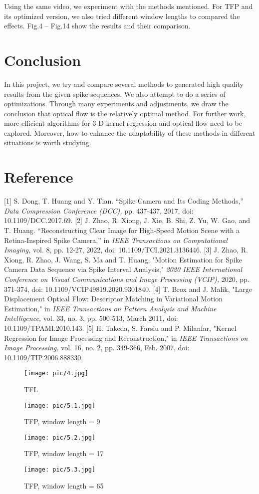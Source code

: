 \documentclass[10pt,twocolumn,letterpaper]{article}
\begin{document}
Using the same video, we experiment with the methods mentioned. For TFP and its optimized version, we also tried different window lengths to compared the effects. Fig.4 – Fig.14 show the results and their comparison.

\section{Conclusion}

In this project, we try and compare several methods to generated high quality results from the given spike sequences. We also attempt to do a series of optimizations. Through many experiments and adjustments, we draw the conclusion that optical flow is the relatively optimal method. For further work, more efficient algorithms for 3-D kernel regression and optical flow need to be explored. Moreover, how to enhance the adaptability of these methods in different situations is worth studying.

\section{Reference}

[1] S. Dong, T. Huang and Y. Tian. “Spike Camera and Its Coding Methods,” \emph{Data Compression Conference (DCC),} pp. 437-437, 2017, doi: 10.1109/DCC.2017.69.
[2] J. Zhao, R. Xiong, J. Xie, B. Shi, Z. Yu, W. Gao, and T. Huang. “Reconstructing Clear Image for High-Speed Motion Scene with a Retina-Inspired Spike Camera,” in \emph{IEEE Transactions on Computational Imaging,} vol. 8, pp. 12-27, 2022, doi: 10.1109/TCI.2021.3136446.
[3] J. Zhao, R. Xiong, R. Zhao, J. Wang, S. Ma and T. Huang, "Motion Estimation for Spike Camera Data Sequence via Spike Interval Analysis," \emph{2020 IEEE International Conference on Visual Communications and Image Processing (VCIP),} 2020, pp. 371-374, doi: 10.1109/VCIP49819.2020.9301840.
[4] T. Brox and J. Malik, "Large Displacement Optical Flow: Descriptor Matching in Variational Motion Estimation," in \emph{IEEE Transactions on Pattern Analysis and Machine Intelligence,} vol. 33, no. 3, pp. 500-513, March 2011, doi: 10.1109/TPAMI.2010.143.
[5] H. Takeda, S. Farsiu and P. Milanfar, "Kernel Regression for Image Processing and Reconstruction," in \emph{IEEE Transactions on Image Processing,} vol. 16, no. 2, pp. 349-366, Feb. 2007, doi: 10.1109/TIP.2006.888330.

\begin{figure}[htp]
\texttt{[image: pic/4.jpg]}
\caption{TFL}

\texttt{[image: pic/5.1.jpg]}
\caption{TFP, window length = 9}

\texttt{[image: pic/5.2.jpg]}
\caption{TFP, window length = 17}

\texttt{[image: pic/5.3.jpg]}
\caption{TFP, window length = 65}
\end{figure}
\end{document}

